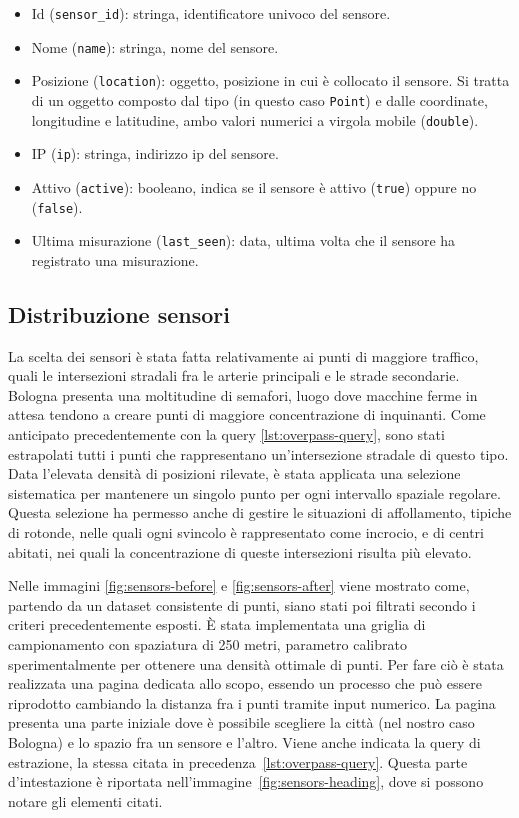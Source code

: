 \begin{itemize}
  \item Id (\texttt{sensor\_id}): stringa, identificatore univoco del sensore.
  \item Nome (\texttt{name}): stringa, nome del sensore.
  \item Posizione (\texttt{location}): oggetto, posizione in cui è collocato il sensore.
        Si tratta di un oggetto composto dal tipo (in questo caso \texttt{Point}) e dalle coordinate,
        longitudine e latitudine, ambo valori numerici a virgola mobile (\texttt{double}).
  \item IP (\texttt{ip}): stringa, indirizzo ip del sensore.
  \item Attivo (\texttt{active}): booleano, indica se il sensore è attivo (\texttt{true})
        oppure no (\texttt{false}).
  \item Ultima misurazione (\texttt{last\_seen}): data, ultima volta che il sensore ha registrato una misurazione.
        \label{lst:sensors-properties}
\end{itemize}

\subsection{Distribuzione sensori}

La scelta dei sensori è stata fatta relativamente ai punti di maggiore traffico, quali le intersezioni stradali
fra le arterie principali e le strade secondarie. Bologna presenta una moltitudine di semafori, luogo dove macchine
ferme in attesa tendono a creare punti di maggiore concentrazione di inquinanti. Come anticipato precedentemente
con la query \ref{lst:overpass-query}, sono stati estrapolati tutti i punti che rappresentano un'intersezione
stradale di questo tipo. Data l'elevata densità di posizioni rilevate, è stata applicata una selezione sistematica
per mantenere un singolo punto per ogni intervallo spaziale regolare.
Questa selezione ha permesso anche di gestire le situazioni di affollamento, tipiche di rotonde,
nelle quali ogni svincolo è rappresentato come incrocio, e di centri abitati, nei quali la concentrazione
di queste intersezioni risulta più elevato.

Nelle immagini \ref{fig:sensors-before} e \ref{fig:sensors-after} viene mostrato come, partendo da un dataset
consistente di punti, siano stati poi filtrati secondo i criteri precedentemente esposti.
È stata implementata una griglia di campionamento con spaziatura di 250 metri, parametro calibrato
sperimentalmente per ottenere una densità ottimale di punti. Per fare ciò è stata realizzata una pagina dedicata
allo scopo, essendo un processo che può essere riprodotto cambiando la distanza fra i punti tramite input numerico.
La pagina presenta una parte iniziale dove è possibile scegliere la città (nel nostro caso Bologna) e lo spazio
fra un sensore e l'altro. Viene anche indicata la query di estrazione,
la stessa citata in precedenza~\ref{lst:overpass-query}.
Questa parte d'intestazione è riportata nell'immagine~\ref{fig:sensors-heading}, dove si possono notare gli elementi
citati.

